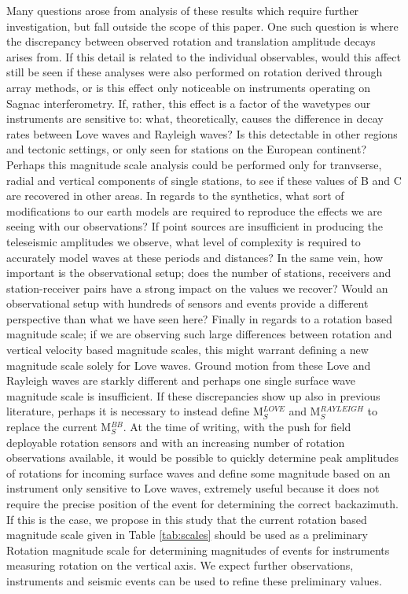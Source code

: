 \documentclass{gji}
\begin{document}
Many questions arose from analysis of these results which require further investigation, but fall outside the scope of this paper. One such question is where the discrepancy between observed rotation and translation amplitude decays arises from. If this detail is related to the individual observables, would this affect still be seen if these analyses were also performed on rotation derived through array methods, or is this effect only noticeable on instruments operating on Sagnac interferometry. If, rather, this effect is a factor of the wavetypes our instruments are sensitive to: what, theoretically, causes the difference in decay rates between Love waves and Rayleigh waves? Is this detectable in other regions and tectonic settings, or only seen for stations on the European continent? Perhaps this magnitude scale analysis could be performed only for tranvserse, radial and vertical components of single stations, to see if these values of B and C are recovered in other areas. In regards to the synthetics, what sort of modifications to our earth models are required to reproduce the effects we are seeing with our observations? If point sources are insufficient in producing the teleseismic amplitudes we observe, what level of complexity is required to accurately model waves at these periods and distances? In the same vein, how important is the observational setup; does the number of stations, receivers and station-receiver pairs have a strong impact on the values we recover? Would an observational setup with hundreds of sensors and events provide a different perspective than what we have seen here? Finally in regards to a rotation based magnitude scale; if we are observing such large differences between rotation and vertical velocity based magnitude scales, this might warrant defining a new magnitude scale solely for Love waves. Ground motion from these Love and Rayleigh waves are starkly different and perhaps one single surface wave magnitude scale is insufficient. If these discrepancies show up also in previous literature, perhaps it is necessary to instead define M$_S^{LOVE}$ and M$_S^{RAYLEIGH}$ to replace the current M$_S^{BB}$. At the time of writing, with the push for field deployable rotation sensors and with an increasing number of rotation observations available, it would be possible to quickly determine peak amplitudes of rotations for incoming surface waves and define some magnitude based on an instrument only sensitive to Love waves, extremely useful because it does not require the precise position of the event for determining the correct backazimuth. If this is the case, we propose in this study that the current rotation based magnitude scale given in Table \ref{tab:scales} should be used as a preliminary Rotation magnitude scale for determining magnitudes of events for instruments measuring rotation on the vertical axis. We expect further observations, instruments and seismic events can be used to refine these preliminary values.
\end{document}

